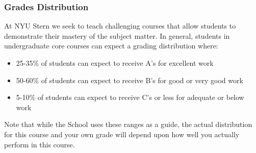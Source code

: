 \documentclass[12pt,pdftex,twoside,letterpaper]{exam}
\begin{document}
\subsubsection*{Grades Distribution}
At NYU Stern we seek to teach challenging courses that allow students to demonstrate their mastery of the subject matter.  In general, students in undergraduate core courses can expect a grading distribution where:
\begin{itemize}
\item 25-35\% of students can expect to receive A's for excellent work
\item 50-60\% of students can expect to receive B's for good or very good work
\item 5-10\% of students can expect to receive C's or less for adequate or below work
\end{itemize}
Note that while the School uses these ranges as a guide, the actual distribution for this course and your own grade will depend upon how well you actually perform in this course.
\end{document}
